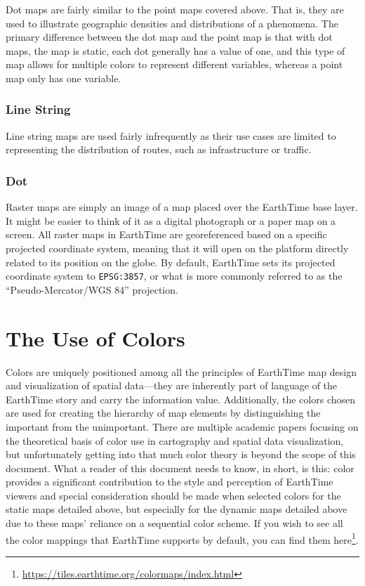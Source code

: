 \documentclass[
]{book}
\renewcommand{\href}[2]{#2\footnote{\url{#1}}}
\begin{document}
Dot maps are fairly similar to the point maps covered above. That is, they are used to illustrate geographic densities and distributions of a phenomena. The primary difference between the dot map and the point map is that with dot maps, the map is static, each dot generally has a value of one, and this type of map allows for multiple colors to represent different variables, whereas a point map only has one variable.

\hypertarget{line-string}{%
\subsubsection*{Line String}\label{line-string}}


Line string maps are used fairly infrequently as their use cases are limited to representing the distribution of routes, such as infrastructure or traffic.

\hypertarget{dot-1}{%
\subsubsection*{Dot}\label{dot-1}}


Raster maps are simply an image of a map placed over the EarthTime base layer. It might be easier to think of it as a digital photograph or a paper map on a screen. All raster maps in EarthTime are georeferenced based on a specific projected coordinate system, meaning that it will open on the platform directly related to its position on the globe. By default, EarthTime sets its projected coordinate system to \texttt{EPSG:3857}, or what is more commonly referred to as the ``Pseudo-Mercator/WGS 84'' projection.

\hypertarget{the-use-of-colors}{%
\section{The Use of Colors}\label{the-use-of-colors}}

Colors are uniquely positioned among all the principles of EarthTime map design and visualization of spatial data---they are inherently part of language of the EarthTime story and carry the information value. Additionally, the colors chosen are used for creating the hierarchy of map elements by distinguishing the important from the unimportant. There are multiple academic papers focusing on the theoretical basis of color use in cartography and spatial data visualization, but unfortunately getting into that much color theory is beyond the scope of this document. What a reader of this document needs to know, in short, is this: color provides a significant contribution to the style and perception of EarthTime viewers and special consideration should be made when selected colors for the static maps detailed above, but especially for the dynamic maps detailed above due to these maps' reliance on a sequential color scheme. If you wish to see all the color mappings that EarthTime supports by default, you can find them \href{https://tiles.earthtime.org/colormaps/index.html}{here}.
\end{document}
